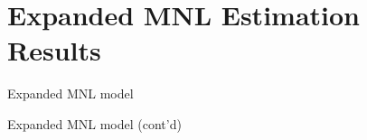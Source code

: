 \documentclass[preprint]{elsarticle}
\begin{document}
\begin{appendices}
\newpage
\section{Expanded MNL Estimation Results}
\label{sec:appendix-b-expanded-results}
\begin{table}[!htbp]
\centering

\caption{Expanded MNL model}
\label{table:vehicle-choice-expanded-mnl-results}
\end{table}

\begin{table}
\centering

\caption{Expanded MNL model (cont'd)}
\label{table:vehicle-choice-expanded-mnl-results-2}
\end{table}

\newpage
\section*{\refname}


\end{appendices}
\end{document}
